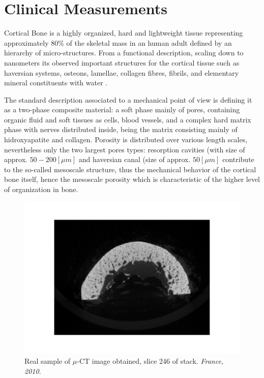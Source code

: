 \chapter{Clinical Measurements}
Cortical Bone is a highly organized, hard and lightweight tissue representing approximately 80\% of the skeletal mass in an human adult defined by an hierarchy of micro-structures. From a functional description, scaling down to nanometers its observed important structures for the cortical tissue such as haversian systems, osteons, lamellae, collagen fibres, fibrils, and elementary mineral constituents with water \cite{Parnell2008}. 

The standard description associated to a mechanical point of view is defining it as a two-phase composite material: a soft phase mainly of pores, containing organic fluid and soft tissues as cells, blood vessels, and a complex hard matrix phase with nerves distributed inside, being the matrix consisting mainly of hidroxyapatite and collagen. Porosity is distributed over various length scales, nevertheless only the two largest pores types: resorption cavities (with size of approx. $50-200 [\mu m]$ and haversian canal (size of approx. $50 [ \mu m ]$ contribute to the so-called mesoscale structure, thus the mechanical behavior of the cortical bone itself, hence the mesoscale porosity which is characteristic of the higher level of organization in bone. 

\begin{figure}[!h]
	\centering
	\includegraphics[scale=.5]{images/ImgExt/246-2010_rec0964.pdf}
	\caption{Real sample of $\mu$-CT image obtained, slice 246 of stack. \textit{France, 2010}.}
	\label{muCT-Image}
\end{figure}


